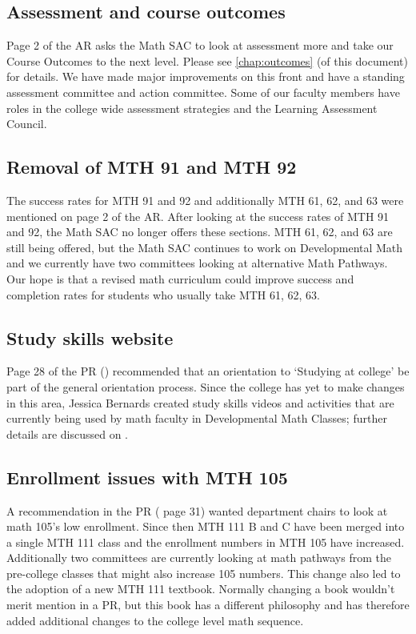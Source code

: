 \subsection{Assessment and course outcomes}
Page 2 of the AR asks the Math SAC to look at assessment more and take our
Course Outcomes to the next level.  Please see \vref{chap:outcomes} (of this
document) for
details.  We have made major improvements on this front and have a standing
assessment committee and action committee.  Some of our faculty members have
roles in the college wide assessment strategies and the Learning Assessment Council.

\subsection{Removal of MTH 91 and MTH 92}
The success rates for MTH 91 and 92 and additionally MTH 61, 62, and 63 were
mentioned on page 2 of the AR.  After looking at the success rates of MTH 91 and
92, the Math SAC no longer offers these sections.   MTH 61, 62, and 63 are still
being offered, but the Math SAC continues to work on Developmental Math and we
currently have two committees looking at alternative Math Pathways. 
Our hope is that a revised math curriculum could improve success and completion rates for students who usually take MTH 61, 62, 63. 

\subsection{Study skills website}
Page 28 of the PR (\cite{mathprogramreview2003}) recommended that an orientation to `Studying at college'
be part of the general orientation process.  Since the college has yet to make
changes in this area, Jessica Bernards created study skills videos and activities
that are currently being used by math faculty in Developmental Math Classes;
further details are discussed on .

\subsection{Enrollment issues with MTH 105}
A recommendation in the PR (\cite{mathprogramreview2003} page 31) wanted department chairs to look at math
105's low enrollment. Since then MTH 111 B and C have been merged into a single
MTH 111 class and the enrollment numbers in MTH 105 have increased.  Additionally two committees are
currently looking at math pathways from the pre-college classes that might also
increase 105 numbers.  This change also led to the adoption of a new MTH 111
textbook.  Normally changing a book wouldn't merit mention in a PR, but this book
has a different philosophy and has therefore added additional changes to the
college level math sequence.

